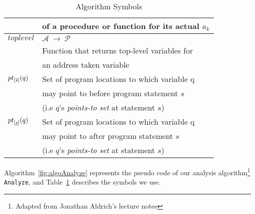 \begin{table}
\begin{tabular}{|l|l|}
								&	of a procedure or function for its actual $a_k$		\\ \hline	
$\mathit{toplevel}$				&	$\mathcal{A}\ \rightarrow\ \mathcal{P}$ 			\\
								& 	Function that returns top-level variables for		\\
								&	an address taken variable							\\ \hline															
${pt}_{[\overline{s}]}(q)$	&	Set of program locations to which variable q		\\
								&	may point to before program statement $s$			\\
								& 	(i.e $q$'s \textit{points-to set} at statement $s$)	\\ \hline					
${pt}_{[\underline{s}]}(q)$	&	Set of program locations to which variable q		\\
								&	may point to after program statement $s$			\\
								& 	(i.e $q$'s \textit{points-to set} at statement $s$)	\\ \hline
\end{tabular}
\caption{Algorithm Symbols}\label{symTable}
\end{table}
Algorithm~\ref{fig:algoAnalyze} represents the pseudo code of
our analysis algorithm\footnote{Adapted from Jonathan Aldrich's
lecture notes} \texttt{Analyze}, and Table~\ref{symTable}
describes the symbols we use.

